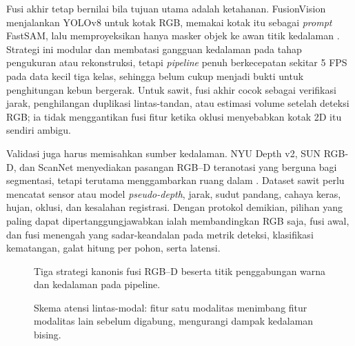 Fusi akhir tetap bernilai bila tujuan utama adalah ketahanan. FusionVision
menjalankan YOLOv8 untuk kotak RGB, memakai kotak itu sebagai \textit{prompt}
FastSAM, lalu memproyeksikan hanya masker objek ke awan titik kedalaman
\cite{elamraoui2024fusionvision}. Strategi ini modular dan membatasi gangguan
kedalaman pada tahap pengukuran atau rekonstruksi, tetapi \textit{pipeline}
penuh berkecepatan sekitar 5 FPS pada data kecil tiga kelas, sehingga belum
cukup menjadi bukti untuk penghitungan kebun bergerak. Untuk sawit, fusi akhir
cocok sebagai verifikasi jarak, penghilangan duplikasi lintas-tandan, atau
estimasi volume setelah deteksi RGB; ia tidak menggantikan fusi fitur ketika
oklusi menyebabkan kotak 2D itu sendiri ambigu.

Validasi juga harus memisahkan sumber kedalaman. NYU Depth v2, SUN RGB-D, dan
ScanNet menyediakan pasangan RGB--D teranotasi yang berguna bagi segmentasi,
tetapi terutama menggambarkan ruang dalam \cite{silberman2012nyu,song2015sunrgbd,dai2017scannet}.
Dataset sawit perlu mencatat sensor atau model \textit{pseudo-depth}, jarak,
sudut pandang, cahaya keras, hujan, oklusi, dan kesalahan registrasi. Dengan
protokol demikian, pilihan yang paling dapat dipertanggungjawabkan ialah
membandingkan RGB saja, fusi awal, dan fusi menengah yang sadar-keandalan pada
metrik deteksi, klasifikasi kematangan, galat hitung per pohon, serta latensi.

\begin{figure}[t]
\centering
{}
\caption{Tiga strategi kanonis fusi RGB--D beserta titik penggabungan
warna dan kedalaman pada pipeline.}
\label{fig:strategi}
\end{figure}

\begin{figure}[t]
\centering
{}
\caption{Skema atensi lintas-modal: fitur satu modalitas menimbang fitur
modalitas lain sebelum digabung, mengurangi dampak kedalaman bising.}
\label{fig:atensi}
\end{figure}

